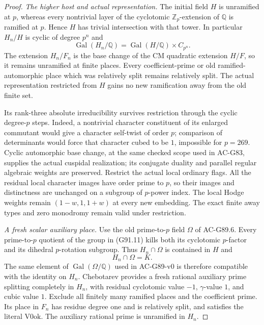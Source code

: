 \begin{proof}
\emph{The higher host and actual representation.}
The initial field $H$ is unramified at $p$, whereas every
nontrivial layer of the cyclotomic $\mathbb Z_p$-extension
of $\mathbb Q$ is ramified at $p$.
Hence $H$ has trivial intersection with that tower.
In particular $H_n/H$ is cyclic of degree $p^n$ and
\[
 \operatorname{Gal}(H_n/\mathbb Q)
      =\operatorname{Gal}(H/\mathbb Q)\times C_{p^n}.
 \tag{G91.11}
\]
The extension $H_n/F_n$ is the base change of the CM quadratic
extension $H/F$, so it remains unramified at finite places.
Every coefficient-prime or old ramified-automorphic place
which was relatively split remains relatively split.
The actual representation restricted from $H$ gains no new
ramification away from the old finite set.

Its rank-three absolute irreducibility survives restriction
through the cyclic degree-$p$ steps.  Indeed, a nontrivial
character constituent of its enlarged commutant would give
a character self-twist of order $p$; comparison of determinants
would force that character cubed to be $1$, impossible for
$p=269$.  Cyclic automorphic base change, at the same checked
scope used in AC-G83, supplies the actual cuspidal realization;
its conjugate duality and parallel regular algebraic weights
are preserved.  Restrict the actual local ordinary flags.
All the residual local character images have order prime to
$p$, so their images and distinctness are unchanged on a
subgroup of $p$-power index.  The local Hodge weights remain
$(1-w,1,1+w)$ at every new embedding.  The exact finite
away types and zero monodromy remain valid under restriction.

\emph{A fresh scalar auxiliary place.}
Use the old prime-to-$p$ field $\Omega$ of AC-G89.6.
Every prime-to-$p$ quotient of the group in (G91.11) kills
both its cyclotomic $p$-factor and its dihedral $p$-rotation
subgroup.  Thus $H_n\cap\Omega$ is contained in $H$ and
\[
                         H_n\cap\Omega=K.
 \tag{G91.12}
\]
The same element of $\operatorname{Gal}(\Omega/\mathbb Q)$
used in AC-G89-v0 is therefore compatible with the identity
on $H_n$.  Chebotarev provides a fresh rational auxiliary
prime splitting completely in $H_n$, with residual
cyclotomic value $-1$, $\gamma$-value $1$, and cubic value $1$.
Exclude all finitely many ramified places and the coefficient
prime.  Its place in $F_n$ has residue degree one and is
relatively split, and satisfies the literal $\mathrm{V0ok}$.
The auxiliary rational prime is unramified in $H_n$.


\end{proof}
